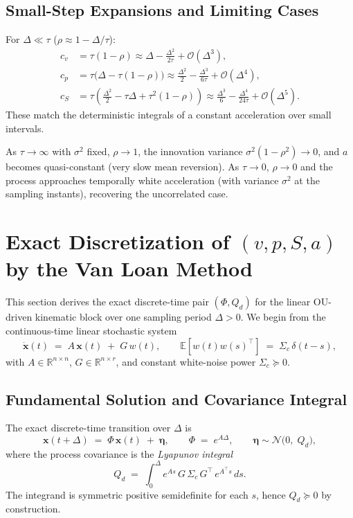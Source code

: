 \documentclass[10pt]{extarticle}
\begin{document}
\subsection{Small-Step Expansions and Limiting Cases}
For $\Delta\ll\tau$ ($\rho \approx 1-\Delta/\tau$):
\begin{align}
c_v &= \tau(1-\rho) \approx \Delta - \tfrac{\Delta^2}{2\tau} + \mathcal{O}(\Delta^3),\\
c_p &= \tau\big(\Delta - \tau(1-\rho)\big) \approx \tfrac{\Delta^2}{2} - \tfrac{\Delta^3}{6\tau} + \mathcal{O}(\Delta^4),\\
c_S &= \tau\!\left(\tfrac{\Delta^2}{2} - \tau\Delta + \tau^2(1-\rho)\right) \approx \tfrac{\Delta^3}{6} - \tfrac{\Delta^4}{24\tau} + \mathcal{O}(\Delta^5).
\end{align}
These match the deterministic integrals of a constant acceleration over small intervals.

As $\tau\to\infty$ with $\sigma^2$ fixed, $\rho\to 1$, the innovation variance $\sigma^2(1-\rho^2)\to 0$,
and $a$ becomes quasi-constant (very slow mean reversion). As $\tau\to 0$, $\rho\to 0$ and
the process approaches temporally white acceleration (with variance $\sigma^2$ at the sampling instants),
recovering the uncorrelated case.

\section{Exact Discretization of $(v,p,S,a)$ by the Van Loan Method}
\label{sec:van-loan}

This section derives the exact discrete-time pair $(\Phi,Q_d)$ for the linear OU-driven kinematic block
over one sampling period $\Delta>0$. We begin from the continuous-time linear stochastic system
\begin{equation}
\dot{\bm x}(t) \;=\; A\,\bm x(t) \;+\; G\,w(t), 
\qquad
\mathbb{E}\!\left[w(t)w(s)^\top\right] \;=\; \Sigma_c\,\delta(t-s),
\label{eq:lti-sde}
\end{equation}
with $A\in\mathbb{R}^{n\times n}$, $G\in\mathbb{R}^{n\times r}$, and constant white-noise power $\Sigma_c\succeq 0$.

\subsection{Fundamental Solution and Covariance Integral}
The exact discrete-time transition over $\Delta$ is
\begin{equation}
\bm x(t+\Delta) \;=\; \Phi\,\bm x(t) \;+\; \bm \eta,\qquad
\Phi \;=\; e^{A\Delta},\qquad
\bm\eta \sim \mathcal{N}\!\Big(0,\; Q_d \Big), 
\label{eq:phi-qd-def}
\end{equation}
where the process covariance is the \emph{Lyapunov integral}
\begin{equation}
Q_d \;=\; \int_0^\Delta e^{A s}\,G\,\Sigma_c\,G^\top\,e^{A^\top s}\,ds.
\label{eq:qd-integral}
\end{equation}
The integrand is symmetric positive semidefinite for each $s$, hence $Q_d\succeq 0$ by construction.
\end{document}
